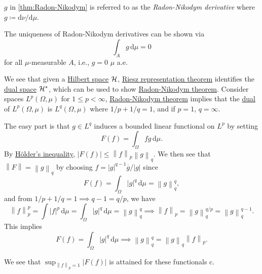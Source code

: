\begin{notation}
	\(g\) in \autoref{thm:Radon-Nikodym} is referred to as the \emph{Radon-Nikodym derivative} where \(g \coloneqq \mathrm{d}\nu /\mathrm{d}\mu \).
	\begin{note}[Uniqueness]
		The uniqueness of Radon-Nikodym derivatives can be shown via
		\[
			\int _A g\,\mathrm{d} \mu = 0
		\]
		for all \(\mu \)-measurable \(A\), i.e., \(g=0\) \(\mu\) a.e.
	\end{note}
\end{notation}

\begin{remark}
	We see that given a \hyperref[def:Hilbert-space]{Hilbert space} \(\mathcal{\MakeUppercase{h}} \), \hyperref[thm:Riesz-representation]{Riesz representation theorem} identifies the \hyperref[def:dual-space]{dual space} \(\mathcal{\MakeUppercase{h}} ^{\ast} \), which can be used to show \hyperref[thm:Radon-Nikodym]{Radon-Nikodym theorem}. Consider spaces \(L^p(\Omega , \mu )\) for \(1 \leq p < \infty \), \hyperref[thm:Radon-Nikodym]{Radon-Nikodym theorem} implies that the \hyperref[def:dual-space]{dual} of \(L^p(\Omega , \mu )\) is \(L^q(\Omega , \mu )\) where \(1 / p + 1 / q = 1\), and if \(p = 1\), \(q = \infty \).
\end{remark}
\begin{explanation}
	The easy part is that \(g\in L^q\) induces a bounded linear functional on \(L^p\) by setting
	\[
		F(f) = \int _\Omega fg\,\mathrm{d} \mu.
	\]
	By \hyperref[lma:Holder-ineq]{Hölder's inequality}, \(\left\vert F(f) \right\vert \leq \left\lVert f\right\rVert _p \left\lVert g\right\rVert _q\). We then see that \(\left\lVert F\right\rVert = \left\lVert g\right\rVert _q\) by choosing \(f = \left\vert g \right\vert ^{q - 1}\overline{g} / \left\vert g \right\vert\) since
	\[
		F(f) = \int _\Omega \left\vert g \right\vert ^q\,\mathrm{d} \mu = \left\lVert g\right\rVert ^q_q,
	\]
	and from \(1 / p + 1 / q = 1 \implies q-1 = q / p\), we have
	\[
		\left\lVert f\right\rVert ^p_p = \int \left\vert f \right\vert ^p \,\mathrm{d} \mu= \int _\Omega \left\vert g \right\vert ^q\,\mathrm{d} \mu = \left\lVert g\right\rVert _q^q \implies \left\lVert f\right\rVert _p = \left\lVert g\right\rVert _q^{q / p} = \left\lVert g\right\rVert _q^{q - 1}.
	\]
	This implies
	\[
		F(f) = \int _\Omega \left\vert g \right\vert ^q\,\mathrm{d} \mu \implies \left\lVert g\right\rVert ^q_q = \left\lVert g\right\rVert _q \left\lVert f\right\rVert _p.
	\]
	\begin{note}
		We see that \(\sup _{\left\lVert f\right\rVert _p = 1} \left\vert F(f) \right\vert \) is attained for these functionals c.
	\end{note}
\end{explanation}

